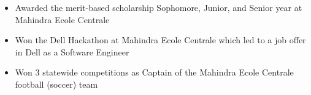 \documentclass{article}
\begin{document}
\begin{itemize}[leftmargin=1em]



\setlength\itemsep{-0.4em}
\normalfont

\item Awarded the merit-based scholarship Sophomore, Junior, and Senior year at Mahindra Ecole Centrale
\item Won the Dell Hackathon at Mahindra Ecole Centrale which led to a job offer in Dell as a Software Engineer
\item Won 3 statewide competitions as Captain of the Mahindra Ecole Centrale football (soccer) team 

\end{itemize}
\end{document}
